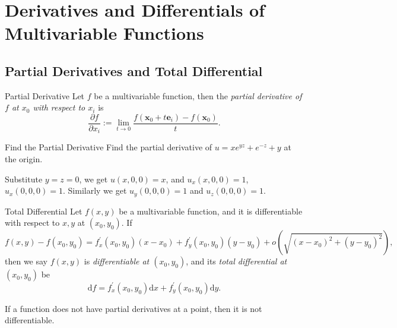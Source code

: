 
\section{Derivatives and Differentials of Multivariable Functions}

\subsection{Partial Derivatives and Total Differential}

\begin{definition}{Partial Derivative}{}
  Let $f$ be a multivariable function, then the \emph{partial derivative of $f$
  at $x_0$ with respect to $x_i$} is
  \begin{equation}
    \frac{\partial f}{\partial x_i} := \lim \limits _{t \rightarrow 0} \frac{f(\mathbf{x}_0 + t\mathbf{e}_i) - f(\mathbf{x}_0)}{t}.
  \end{equation}
\end{definition}

\begin{example}{Find the Partial Derivative}{}
  Find the partial derivative of $u = xe^{yz} + e^{-z} + y$ at the origin.
\end{example}

\begin{solution}
  Substitute $y = z = 0$, we get $u(x, 0, 0) = x$, and $u_x(x,0,0) = 1$,
  $u_x(0,0,0) = 1$.
  Similarly we get $u_y(0,0,0) = 1$ and $u_z(0,0,0) = 1$.
\end{solution}

\begin{definition}{Total Differential}{}
  Let $f(x, y)$ be a multivariable function,
  and it is differentiable with respect to $x, y$ at $(x_0, y_0)$.
  If
  \begin{equation}
    f(x, y) - f(x_0, y_0) = f^{\prime}_x(x_0, y_0)(x - x_0)
    + f^{\prime}_y (x_0, y_0)(y - y_0) + o(\sqrt{(x - x_0)^2 + (y - y_0)^2}),
  \end{equation}
  then we say $f(x,y)$ is \emph{differentiable at $(x_0, y_0)$},
  and its \emph{total differential at $(x_0, y_0)$} be
  \begin{equation}
    \mathrm{d} f = f_x^{\prime}(x_0, y_0) \mathrm{d} x + f_y^{\prime}(x_0, y_0) \mathrm{d} y.
  \end{equation}
\end{definition}

\begin{note}
  If a function does not have partial derivatives at a point,
  then it is not differentiable.
\end{note}


